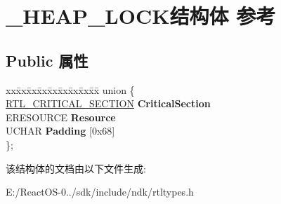 \hypertarget{struct___h_e_a_p___l_o_c_k}{}\section{\+\_\+\+H\+E\+A\+P\+\_\+\+L\+O\+C\+K结构体 参考}
\label{struct___h_e_a_p___l_o_c_k}
\subsection*{Public 属性}
\begin{DoxyCompactItemize}
\item 
\mbox{\label{struct___h_e_a_p___l_o_c_k_a9c534303021ee571b344031b95df4e9f}} 
\begin{tabbing}
xx\=xx\=xx\=xx\=xx\=xx\=xx\=xx\=xx\=\kill
union \{\\
\>\hyperlink{struct___r_t_l___c_r_i_t_i_c_a_l___s_e_c_t_i_o_n}{RTL\_CRITICAL\_SECTION} {\bfseries CriticalSection}\\
\>ERESOURCE {\bfseries Resource}\\
\>UCHAR {\bfseries Padding} \mbox{[}0x68\mbox{]}\\
\}; \\

\end{tabbing}\end{DoxyCompactItemize}


该结构体的文档由以下文件生成\+:\begin{DoxyCompactItemize}
\item 
E\+:/\+React\+O\+S-\/0../sdk/include/ndk/rtltypes.\+h\end{DoxyCompactItemize}
